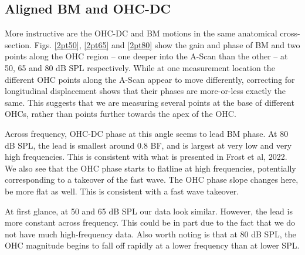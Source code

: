 \documentclass{article}
\begin{document}
\subsection{Aligned BM and OHC-DC}
\par{More instructive are the OHC-DC and BM motions in the same anatomical cross-section. Figs. \ref{2pt50}, \ref{2pt65} and \ref{2pt80} show the gain and phase of BM and two points along the OHC region -- one deeper into the A-Scan than the other -- at 50, 65 and 80 dB SPL respectively. While at one measurement location the different OHC points along the A-Scan appear to move differently, correcting for longitudinal displacement shows that their phases are more-or-less exactly the same. This suggests that we are measuring several points at the base of different OHCs, rather than points further towards the apex of the OHC.}
\par{Across frequency, OHC-DC phase at this angle seems to lead BM phase. At 80 dB SPL, the lead is smallest around 0.8 BF, and is largest at very low and very high frequencies. This is consistent with what is presented in Frost et al, 2022. We also see that the OHC phase starts to flatline at high frequencies, potentially corresponding to a takeover of the fast wave. The OHC phase slope changes here, be more flat as well. This is consistent with a fast wave takeover.}
\par{At first glance, at 50 and 65 dB SPL our data look similar. However, the lead is more constant across frequency. This could be in part due to the fact that we do not have much high-frequency data. Also worth noting is that at 80 dB SPL, the OHC magnitude begins to fall off rapidly at a lower frequency than at lower SPL.}
\end{document}
